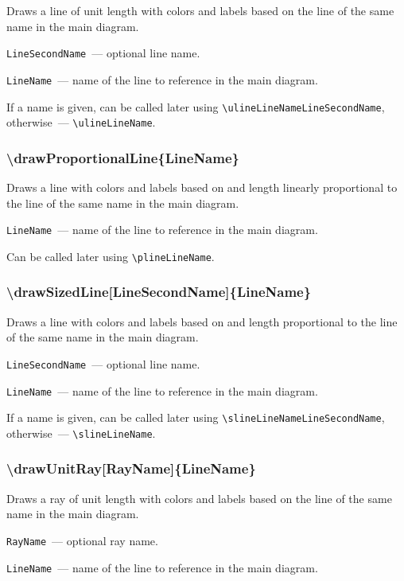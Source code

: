 	Draws a line of unit length with colors and labels based on the line of the same name in the main diagram.

	\texttt{LineSecondName}~— optional line name.
	
	\texttt{LineName}~— name of the line to reference in the main diagram. 

	If a name is given, can be called later using \texttt{\textbackslash ulineLineNameLineSecondName}, otherwise~— \texttt{\textbackslash ulineLineName}. 

\subsubsection{\textbackslash drawProportionalLine\{LineName\}}

	Draws a line with colors and labels based on and length linearly proportional to the line of the same name in the main diagram.

	\texttt{LineName}~— name of the line to reference in the main diagram. 
	
	Can be called later using \texttt{\textbackslash plineLineName}.


\subsubsection{\textbackslash drawSizedLine[LineSecondName]\{LineName\}}

	Draws a line with colors and labels based on and length proportional to the line of the same name in the main diagram.

	\texttt{LineSecondName}~— optional line name. 
	
	\texttt{LineName}~— name of the line to reference in the main diagram. 
	
	If a name is given, can be called later using \texttt{\textbackslash slineLineNameLineSecondName}, otherwise~— \texttt{\textbackslash slineLineName}. 

\subsubsection{\textbackslash drawUnitRay[RayName]\{LineName\}}

	Draws a ray of unit length with colors and labels based on the line of the same name in the main diagram.

	\texttt{RayName}~— optional ray name.
	
	\texttt{LineName}~— name of the line to reference in the main diagram. 

